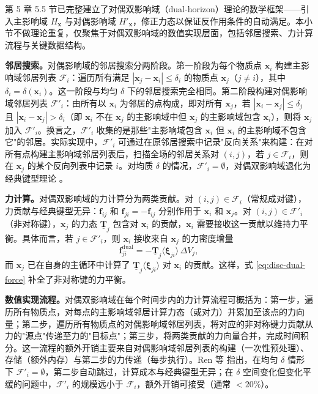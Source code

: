 第 5 章 5.5 节已完整建立了对偶双影响域（dual-horizon）理论的数学框架——引入主影响域 $H_{\mathbf{x}}$ 与对偶影响域 $H'_{\mathbf{x}}$，修正力态以保证反作用条件的自动满足。本小节不做理论重复，仅聚焦于对偶双影响域的数值实现层面，包括邻居搜索、力计算流程与关键数据结构。

\textbf{邻居搜索。}对偶影响域的邻居搜索分两阶段。第一阶段为每个物质点 $\mathbf{x}_i$ 构建主影响域邻居列表 $\mathcal{F}_i$：遍历所有满足 $|\mathbf{x}_j-\mathbf{x}_i|\le\delta_i$ 的物质点 $\mathbf{x}_j$（$j\neq i$），其中 $\delta_i=\delta(\mathbf{x}_i)$。这一阶段与均匀 $\delta$ 下的邻居搜索完全相同。第二阶段构建对偶影响域邻居列表 $\mathcal{F}'_i$：由所有以 $\mathbf{x}_i$ 为邻居的点构成，即对所有 $\mathbf{x}_j$，若 $|\mathbf{x}_i-\mathbf{x}_j|\le\delta_j$ 且 $|\mathbf{x}_i-\mathbf{x}_j|>\delta_i$（即 $\mathbf{x}_i$ 不在 $\mathbf{x}_j$ 的主影响域中但 $\mathbf{x}_j$ 的主影响域包含 $\mathbf{x}_i$），则将 $\mathbf{x}_j$ 加入 $\mathcal{F}'_i$。换言之，$\mathcal{F}'_i$ 收集的是那些"主影响域包含 $\mathbf{x}_i$ 但 $\mathbf{x}_i$ 的主影响域不包含它"的邻居。实际实现中，$\mathcal{F}'_i$ 可通过在原邻居搜索中记录"反向关系"来构建：在对所有点构建主影响域邻居列表后，扫描全场的邻居关系对 $(i,j)$，若 $j\in\mathcal{F}_i$，则在 $\mathbf{x}_j$ 的某个反向列表中记录 $i$。对均质 $\delta$ 的情况，$\mathcal{F}'_i=\emptyset$，对偶双影响域退化为经典键型理论 \cite{Ren2017dualhorizon}。

\textbf{力计算。}对偶双影响域的力计算分为两类贡献。对 $(i,j)\in\mathcal{F}_i$（常规成对键），力贡献与经典键型无异：$\mathbf{f}_{ij}$ 和 $\mathbf{f}_{ji}=-\mathbf{f}_{ij}$ 分别作用于 $\mathbf{x}_i$ 和 $\mathbf{x}_j$。对 $(i,j)\in\mathcal{F}'_i$（非对称键），$\mathbf{x}_j$ 的力态 $\underline{\mathbf{T}}_j$ 包含对 $\mathbf{x}_i$ 的贡献，$\mathbf{x}_i$ 需要接收这一贡献以维持力平衡。具体而言，若 $j\in\mathcal{F}'_i$，则 $\mathbf{x}_i$ 接收来自 $\mathbf{x}_j$ 的力密度增量
\begin{equation}
  \mathbf{f}_{ji}^{\text{dual}}
  =-\underline{\mathbf{T}}_j\langle\boldsymbol{\xi}_{ji}\rangle\,\Delta V_j,
  \label{eq:disc-dual-force}
\end{equation}
而 $\mathbf{x}_j$ 已在自身的主循环中计算了 $\underline{\mathbf{T}}_j\langle\boldsymbol{\xi}_{ji}\rangle$ 对 $\mathbf{x}_i$ 的贡献。这样，式 \eqref{eq:disc-dual-force} 补全了非对称键的力平衡。

\textbf{数值实现流程。}对偶双影响域在每个时间步内的力计算流程可概括为：第一步，遍历所有物质点，对每点的主影响域邻居计算力态（或对力）并累加至该点的力向量；第二步，遍历所有物质点的对偶影响域邻居列表，将对应的非对称键力贡献从力的"源点"传递至力的"目标点"；第三步，将两类贡献的力向量合并，完成时间积分。这一流程的额外开销主要来自对偶影响域邻居列表的构建（一次性预处理）、存储（额外内存）与第二步的力传递（每步执行）。Ren 等 \cite{Ren2017dualhorizon} 指出，在均匀 $\delta$ 情形下 $\mathcal{F}'_i=\emptyset$，第二步自动跳过，计算成本与经典键型无异；在 $\delta$ 空间变化但变化平缓的问题中，$\mathcal{F}'_i$ 的规模远小于 $\mathcal{F}_i$，额外开销可接受（通常 $<20\%$）。

